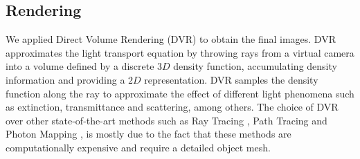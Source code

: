 \subsection{Rendering}
We applied Direct Volume Rendering (DVR) \cite{Kruger2003,Levoy1988, Max1995} to obtain the final images. %
DVR approximates the light transport equation by throwing rays from a virtual camera into a volume defined by a discrete $3D$ density function, accumulating density information and providing a $2D$ representation.
DVR samples the density function along the ray to approximate the effect of different light phenomena such as extinction, transmittance and scattering, among others.
%
%
The choice of DVR over other state-of-the-art methods such as Ray Tracing \cite{Whitted1980,Singh2010}, Path Tracing \cite{Lafortune1993} and Photon Mapping \cite{Jensen1996}, is mostly due to the fact that these methods are computationally expensive and require a detailed object mesh.

